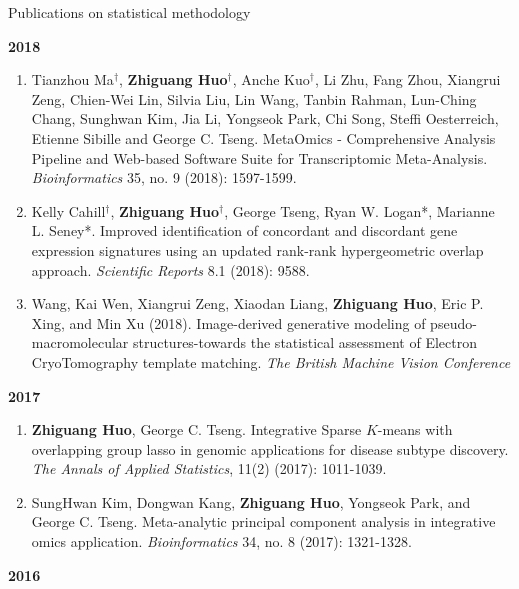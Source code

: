 \documentclass{resume} %
\begin{document}
\begin{rSection}{Publications on statistical methodology}
\begin{enumerate}[noitemsep,topsep=0pt,resume]
\end{enumerate}


\textbf{2018}
\begin{enumerate}[noitemsep,topsep=0pt, resume]

\item Tianzhou Ma$^\dagger$, {\bf  Zhiguang Huo$^\dagger$}, Anche Kuo$^\dagger$, Li Zhu, Fang Zhou, Xiangrui Zeng, Chien-Wei Lin, Silvia Liu, Lin Wang, Tanbin Rahman, Lun-Ching Chang, Sunghwan Kim, Jia Li, Yongseok Park, Chi Song, Steffi Oesterreich, Etienne Sibille and George C. Tseng. 
MetaOmics - Comprehensive Analysis Pipeline and Web-based Software Suite for Transcriptomic Meta-Analysis. \emph{Bioinformatics} 35, no. 9 (2018): 1597-1599. 

\item Kelly Cahill$^\dagger$, {\bf  Zhiguang Huo$^\dagger$}, George Tseng, Ryan W. Logan*, Marianne L. Seney*.
Improved identification of concordant and discordant gene expression signatures using an updated rank-rank hypergeometric overlap approach. \emph{Scientific Reports} 8.1 (2018): 9588.

\item 
Wang, Kai Wen, Xiangrui Zeng, Xiaodan Liang, {\bf Zhiguang Huo}, Eric P. Xing, and Min Xu (2018). Image-derived generative modeling of pseudo-macromolecular structures-towards the statistical assessment of Electron CryoTomography template matching. \emph{The British Machine Vision Conference}

\end{enumerate}

\textbf{2017}
\begin{enumerate}[noitemsep,topsep=0pt, resume]

\item {\bf Zhiguang Huo}, George C. Tseng. 
    Integrative Sparse $K$-means with overlapping group lasso in genomic applications for disease subtype discovery.
    \emph{The Annals of Applied Statistics}, 11(2) (2017): 1011-1039.

\item 
SungHwan Kim, Dongwan Kang, {\bf Zhiguang Huo}, Yongseok Park, and George C. Tseng. 
Meta-analytic principal component analysis in integrative omics application. 
\emph{Bioinformatics} 34, no. 8 (2017): 1321-1328.

\end{enumerate}

\textbf{2016}
\begin{enumerate}[noitemsep,topsep=0pt,resume]


\end{enumerate}
\end{rSection}
\end{document}
